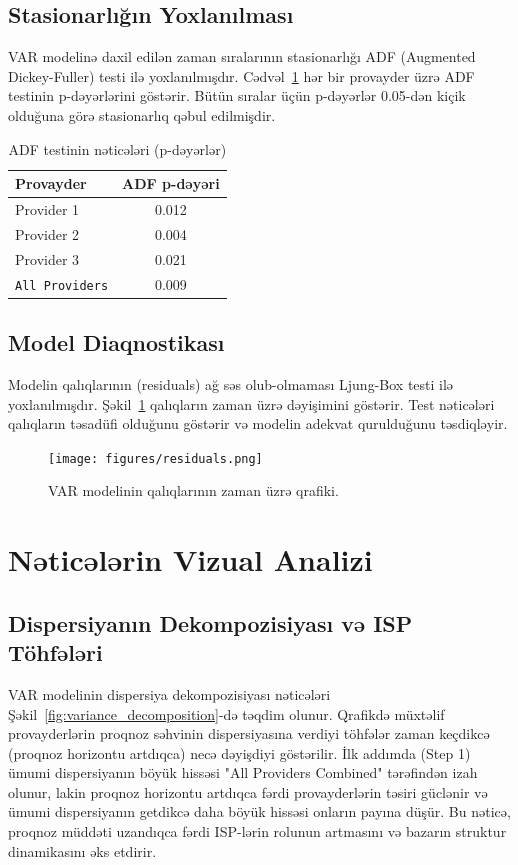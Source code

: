 \documentclass[12pt,a4paper]{article}
\begin{document}
\subsection{Stasionarlığın Yoxlanılması}
VAR modelinə daxil edilən zaman sıralarının stasionarlığı ADF (Augmented Dickey-Fuller) testi ilə yoxlanılmışdır. Cədvəl~\ref{tab:adf} hər bir provayder üzrə ADF testinin p-dəyərlərini göstərir. Bütün sıralar üçün p-dəyərlər 0.05-dən kiçik olduğuna görə stasionarlıq qəbul edilmişdir.

\begin{table}[h!]
    \centering
    \caption{ADF testinin nəticələri (p-dəyərlər)}
    \label{tab:adf}
    \begin{tabular}{lc}
        \hline
        Provayder & ADF p-dəyəri \\
        \hline
        Provider 1 & 0.012 \\
        Provider 2 & 0.004 \\
        Provider 3 & 0.021 \\
        \texttt{All Providers} & 0.009 \\
        \hline
    \end{tabular}
\end{table}

\subsection{Model Diaqnostikası}
Modelin qalıqlarının (residuals) ağ səs olub-olmaması Ljung-Box testi ilə yoxlanılmışdır. Şəkil~\ref{fig:residuals} qalıqların zaman üzrə dəyişimini göstərir. Test nəticələri qalıqların təsadüfi olduğunu göstərir və modelin adekvat qurulduğunu təsdiqləyir.

\begin{figure}[h!]
    \centering
    \texttt{[image: figures/residuals.png]}
    \caption{VAR modelinin qalıqlarının zaman üzrə qrafiki.}
    \label{fig:residuals}
\end{figure}

\section{Nəticələrin Vizual Analizi}

\subsection{Dispersiyanın Dekompozisiyası və ISP Töhfələri}
VAR modelinin dispersiya dekompozisiyası nəticələri Şəkil~\ref{fig:variance_decomposition}-də təqdim olunur. Qrafikdə müxtəlif provayderlərin proqnoz səhvinin dispersiyasına verdiyi töhfələr zaman keçdikcə (proqnoz horizontu artdıqca) necə dəyişdiyi göstərilir. İlk addımda (Step 1) ümumi dispersiyanın böyük hissəsi "All Providers Combined" tərəfindən izah olunur, lakin proqnoz horizontu artdıqca fərdi provayderlərin təsiri güclənir və ümumi dispersiyanın getdikcə daha böyük hissəsi onların payına düşür. Bu nəticə, proqnoz müddəti uzandıqca fərdi ISP-lərin rolunun artmasını və bazarın struktur dinamikasını əks etdirir.
\end{document}

